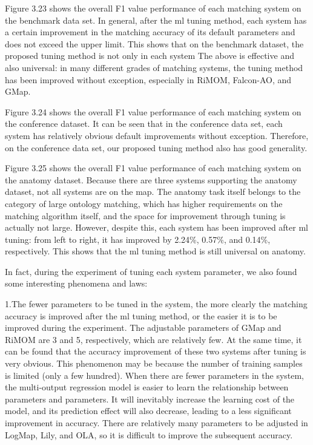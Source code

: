 \documentclass[twoside]{article}
\begin{document}
\begin{multicols}{2}
Figure 3.23 shows the overall F1 value performance of each matching system on the benchmark data set. 
In general, after the ml tuning method, each system has a certain improvement in the matching accuracy of its default parameters and does not exceed the upper limit. This shows that on the benchmark dataset, the proposed tuning method is not only in each system The above is effective and also universal: in many different grades of matching systems, the tuning method has been improved without exception, especially in RiMOM, Falcon-AO, and GMap.

Figure 3.24 shows the overall F1 value performance of each matching system on the conference dataset. 
It can be seen that in the conference data set, each system has relatively obvious default improvements without exception. Therefore, on the conference data set, our proposed tuning method also has good generality.

Figure 3.25 shows the overall F1 value performance of each matching system on the anatomy dataset. 
Because there are three systems supporting the anatomy dataset, not all systems are on the map. 
The anatomy task itself belongs to the category of large ontology matching, which has higher requirements on the matching algorithm itself, and the space for improvement through tuning is actually not large. 
However, despite this, each system has been improved after ml tuning: from left to right, it has improved by 2.24\%, 0.57\%, and 0.14\%, respectively. This shows that the ml tuning method is still universal on anatomy.

In fact, during the experiment of tuning each system parameter, we also found some interesting phenomena and laws:

1.The fewer parameters to be tuned in the system, the more clearly the matching accuracy is improved after the ml tuning method, or the easier it is to be improved during the experiment. 
The adjustable parameters of GMap and RiMOM are 3 and 5, respectively, which are relatively few. At the same time, it can be found that the accuracy improvement of these two systems after tuning is very obvious. 
This phenomenon may be because the number of training samples is limited (only a few hundred). When there are fewer parameters in the system, the multi-output regression model is easier to learn the relationship between parameters and parameters. It will inevitably increase the learning cost of the model, and its prediction effect will also decrease, leading to a less significant improvement in accuracy. There are relatively many parameters to be adjusted in LogMap, Lily, and OLA, so it is difficult to improve the subsequent accuracy.


\end{multicols}
\end{document}
